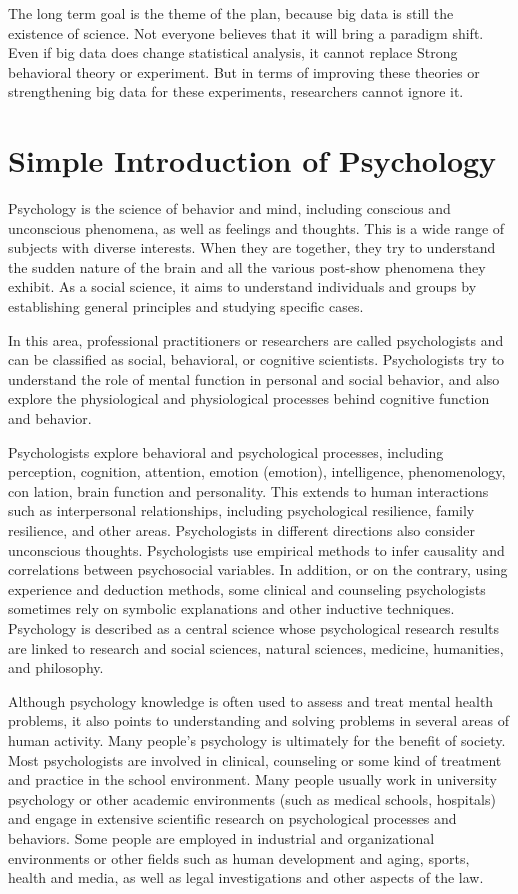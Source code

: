 The long term goal is the theme of the plan, because big data is 
still the existence of science. Not everyone believes that it will 
bring a paradigm shift. Even if big data does change statistical analysis, 
it cannot replace Strong behavioral theory or experiment. But in terms of 
improving these theories or strengthening big data for these experiments, 
researchers cannot ignore it.

\section{Simple Introduction of Psychology}

Psychology is the science of behavior and mind, including conscious 
and unconscious phenomena, as well as feelings and thoughts. This is 
a wide range of subjects with diverse interests. When they are 
together, they try to understand the sudden nature of the brain and 
all the various post-show phenomena they exhibit. As a social science,
 it aims to understand individuals and groups by establishing general
 principles and studying specific cases.

In this area, professional practitioners or researchers are called 
psychologists and can be classified as social, behavioral, or 
cognitive scientists. Psychologists try to understand the role of 
mental function in personal and social behavior, and also explore 
the physiological and physiological processes behind cognitive 
function and behavior.

Psychologists explore behavioral and psychological processes, 
including perception, cognition, attention, emotion (emotion), 
intelligence, phenomenology, con lation, brain function and 
personality. This extends to human interactions such as interpersonal
 relationships, including psychological resilience, family resilience,
 and other areas. Psychologists in different directions also consider
 unconscious thoughts. Psychologists use empirical methods to infer 
causality and correlations between psychosocial variables. In 
addition, or on the contrary, using experience and deduction methods,
 some clinical and counseling psychologists sometimes rely on 
symbolic explanations and other inductive techniques. Psychology is 
described as a central science whose psychological research results 
are linked to research and social sciences, natural sciences, 
medicine, humanities, and philosophy.

Although psychology knowledge is often used to assess and treat 
mental health problems, it also points to understanding and solving 
problems in several areas of human activity. Many people's psychology
 is ultimately for the benefit of society. Most psychologists are 
involved in clinical, counseling or some kind of treatment and 
practice in the school environment. Many people usually work in 
university psychology or other academic environments (such as medical
 schools, hospitals) and engage in extensive scientific research on 
psychological processes and behaviors. Some people are employed in 
industrial and organizational environments or other fields such as 
human development and aging, sports, health and media, as well as 
legal investigations and other aspects of the law.

